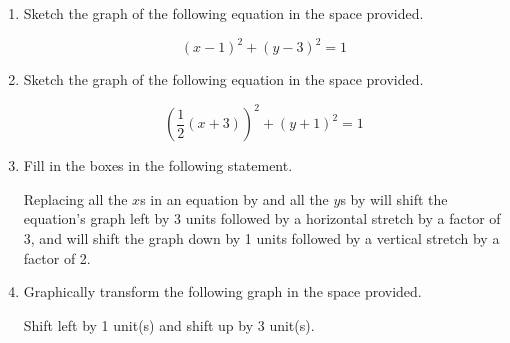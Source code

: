 \documentclass{article}
\begin{document}
\ActivityTitle[class={College Algebra}, number={2}, name={Transformations}]

\begin{enumerate}
\item Sketch the graph of the following equation in the space provided.

\[ (x - 1)^2 + (y - 3)^2 = 1 \]

\begin{center}
\CartesianPlane[axes=yes, h=7, w=7]
\end{center} \vspace{1cm}

\item Sketch the graph of the following equation in the space provided.

\[ \left(\frac{1}{2}(x + 3)\right)^2 + (y + 1)^2 = 1 \]

\begin{center}
\CartesianPlane[axes=yes, h=7, w=7]
\end{center} \vspace{1cm}

\newpage

\item Fill in the boxes in the following statement.

Replacing all the $x$s in an equation by \framebox{\begin{minipage}{3cm} \hfill\vspace{1cm} \end{minipage}} and all the $y$s by \framebox{\begin{minipage}{3cm} \hfill\vspace{1cm} \end{minipage}} will shift the equation's graph left by 3 units followed by a horizontal stretch by a factor of 3, and will shift the graph down by 1 units followed by a vertical stretch by a factor of 2.

   \vspace{3cm}

\item Graphically transform the following graph in the space provided.

\begin{center}
Shift left by 1 unit(s) and shift up by 3 unit(s).
\end{center}

\begin{center}
\MiniGraph[gadget=circle]
\end{center}

   \vspace{1cm}


\end{enumerate}
\end{document}
